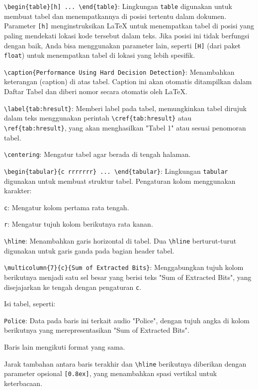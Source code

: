 \begin{packed_enum}
    \item \texttt{\textbackslash begin\{table\}[h] ... \textbackslash end\{table\}}: Lingkungan \texttt{table} digunakan untuk membuat tabel dan menempatkannya di posisi tertentu dalam dokumen. Parameter \texttt{[h]} menginstruksikan LaTeX untuk menempatkan tabel di posisi yang paling mendekati lokasi kode tersebut dalam teks. Jika posisi ini tidak berfungsi dengan baik, Anda bisa menggunakan parameter lain, seperti \texttt{[H]} (dari paket \texttt{float}) untuk menempatkan tabel di lokasi yang lebih spesifik.
    \item \texttt{\textbackslash caption\{Performance Using Hard Decision Detection\}}: Menambahkan keterangan (caption) di atas tabel. Caption ini akan otomatis ditampilkan dalam Daftar Tabel dan diberi nomor secara otomatis oleh LaTeX.
    \item \texttt{\textbackslash label\{tab:hresult\}}: Memberi label pada tabel, memungkinkan tabel dirujuk dalam teks menggunakan perintah \texttt{\textbackslash cref\{tab:hresult\}} atau \texttt{\textbackslash ref\{tab:hresult\}}, yang akan menghasilkan "Tabel 1" atau sesuai penomoran tabel.
    \item \texttt{\textbackslash centering}: Mengatur tabel agar berada di tengah halaman.
    \item \texttt{\textbackslash begin\{tabular\}\{c rrrrrrr\} ... \textbackslash end\{tabular\}}: Lingkungan \texttt{tabular} digunakan untuk membuat struktur tabel. Pengaturan kolom menggunakan karakter:
        \begin{packed_enum}
            \item \texttt{c}: Mengatur kolom pertama rata tengah.
            \item \texttt{r}: Mengatur tujuh kolom berikutnya rata kanan.
        \end{packed_enum}
    \item \texttt{\textbackslash hline}: Menambahkan garis horizontal di tabel. Dua \texttt{\textbackslash hline} berturut-turut digunakan untuk garis ganda pada bagian header tabel.
    \item \texttt{\textbackslash multicolumn\{7\}\{c\}\{Sum of Extracted Bits\}}: Menggabungkan tujuh kolom berikutnya menjadi satu sel besar yang berisi teks "Sum of Extracted Bits", yang disejajarkan ke tengah dengan pengaturan \texttt{c}.
    \item Isi tabel, seperti:
        \begin{packed_enum}
            \item \texttt{Police}: Data pada baris ini terkait audio "Police", dengan tujuh angka di kolom berikutnya yang merepresentasikan "Sum of Extracted Bits".
            \item Baris lain mengikuti format yang sama.
        \end{packed_enum}
    \item Jarak tambahan antara baris terakhir dan \texttt{\textbackslash hline} berikutnya diberikan dengan parameter opsional \texttt{[0.8ex]}, yang menambahkan spasi vertikal untuk keterbacaan.
\end{packed_enum}

